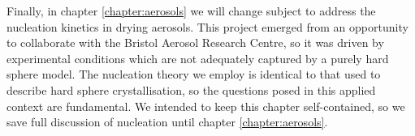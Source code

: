 \documentclass[11pt,twoside]{report}
\def\includebibliography{}
\begin{document}


Finally, in chapter \ref{chapter:aerosols} we will change subject to address the nucleation kinetics in drying aerosols.
This project emerged from an opportunity to collaborate with the Bristol Aerosol Research Centre, so it was driven by experimental conditions which are not adequately captured by a purely hard sphere model.
The nucleation theory we employ is identical to that used to describe hard sphere crystallisation, so the questions posed in this applied context are fundamental.
We intended to keep this chapter self-contained, so we save full discussion of nucleation until chapter \ref{chapter:aerosols}.

\ifdefined\includebibliography
  \printbibliography
\fi
  
\end{document}
